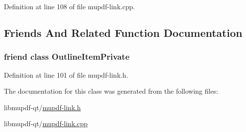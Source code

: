 Definition at line 108 of file mupdf-\/link.\-cpp.



\subsection{Friends And Related Function Documentation}
\hypertarget{class_mu_p_d_f_1_1_link_named_ab008ed670017e41b6e6bba8707c775d2}{
\subsubsection[{Outline\-Item\-Private}]{\setlength{\rightskip}{0pt plus 5cm}friend class Outline\-Item\-Private\hspace{0.3cm}{\ttfamily [friend]}}}\label{class_mu_p_d_f_1_1_link_named_ab008ed670017e41b6e6bba8707c775d2}


Definition at line 101 of file mupdf-\/link.\-h.



The documentation for this class was generated from the following files\-:\begin{DoxyCompactItemize}
\item 
libmupdf-\/qt/\hyperlink{mupdf-link_8h}{mupdf-\/link.\-h}\item 
libmupdf-\/qt/\hyperlink{mupdf-link_8cpp}{mupdf-\/link.\-cpp}\end{DoxyCompactItemize}
